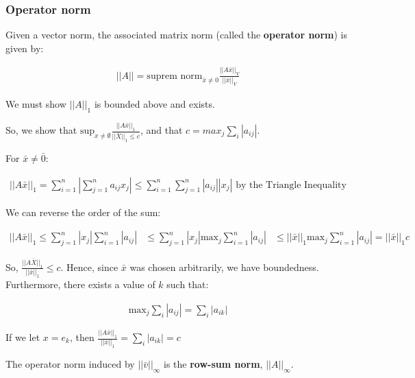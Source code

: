 \subsubsection{Operator norm}

Given a vector norm, the associated matrix norm (called the \textbf{operator norm}) is given by:

\begin{align*}
  ||A|| = \text{suprem norm}_{\bar{x} \neq 0} \frac{||A\bar{x}||_V}{||\bar{x}||_V}
\end{align*}

We must show $||A||_1$ is bounded above and exists.

So, we show that $\text{sup}_{x \neq \emptyset} \frac{||A\bar{x}||_1}{||\bar{X}||_1 \leq c}$, and that $c = max_j \sum_i |a_{ij}|$.

For $\bar{x} \neq \bar{0}$:

\begin{align*}
  ||A\bar{x}||_1 = \sum_{i=1}^n |\sum_{j=1}^n a_{ij} x_j| \leq \sum_{i=1}^n \sum_{j=1}^n |a_{ij}| |x_j|\text{ by the Triangle Inequality}
\end{align*}

We can reverse the order of the sum:

\begin{align*}
  ||A\bar{x}||_1 \leq \sum_{j=1}^n |x_j| \sum_{i=1}^n |a_{ij}| &\leq \sum_{j=1}^n |x_j| \text{max}_j \sum_{i=1}^n |a_{ij}|
  &\leq ||\bar{x}||_1 \text{max}_j \sum_{i=1}^n |a_{ij}| = ||\bar{x}||_1 c
\end{align*}

So, $\frac{||A\bar{X}||_1}{||\bar{x}||_1} \leq c$. Hence, since $\bar{x}$ was chosen arbitrarily, we have boundedness. Furthermore, there exists a value of $k$ such that:

\begin{align*}
  \text{max}_j \sum_i |a_{ij}| = \sum_i |a_{ik}|
\end{align*}

If we let $x = e_k$, then $\frac{||A\bar{x}||_1}{||\bar{x}||_1} = \sum_i |a_{ik}| = c$

The operator norm induced by $||\bar{v}||_\infty$ is the \textbf{row-sum norm}, $||A||_\infty$.